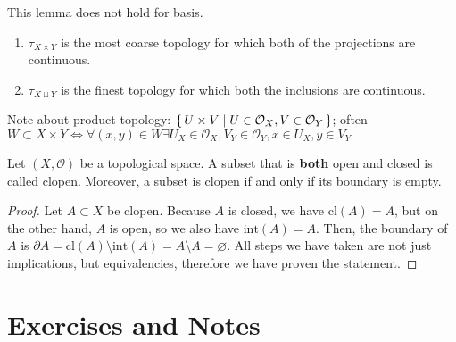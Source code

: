 \begin{remark}
    This lemma does not hold for basis.
\end{remark}


\begin{remark}
    \begin{enumerate}
        \item \(\tau_{X \times Y}\) is the most coarse topology for which both of the projections are continuous.
        \item \(\tau_{X \sqcup Y}\) is the finest topology for which both the inclusions are continuous.
    \end{enumerate}
\end{remark}

    Note about product topology: \(\left\{\, U \times V \mid U \in \mathcal{O}_X, V \in \mathcal{O}_Y \,\right\}\); often \(W \subset X \times Y \iff \forall (x, y) \in W \exists U_X \in \mathcal{O}_X, V_Y \in \mathcal{O}_Y, x \in U_X, y \in V_Y\)

\begin{rembox}
    \begin{remark}
        Let \((X, \mathcal{O})\) be a {\color{mathobj}topological space}. A {\color{mathobj}subset} that is \textbf{both} {\color{mathif}open} and {\color{mathif}closed} is called {\color{maththen}clopen}. Moreover, a subset is {\color{maththen}clopen} if and only if its {\color{maththen}boundary} is {\color{maththen}empty}.
    \end{remark}
\end{rembox}
%
\begin{proof}
    Let \(A \subset X\) be clopen. Because \(A\) is closed, we have \(\mathrm{cl}(A) = A\), but on the other hand, \(A\) is open, so we also have \(\mathrm{int}(A) = A\). Then, the boundary of \(A\) is \(\partial A = \mathrm{cl}(A) \setminus \mathrm{int}(A) = A \setminus A = \varnothing\). All steps we have taken are not just implications, but equivalencies, therefore we have proven the statement.
\end{proof}
\newpage
\section{Exercises and Notes}

